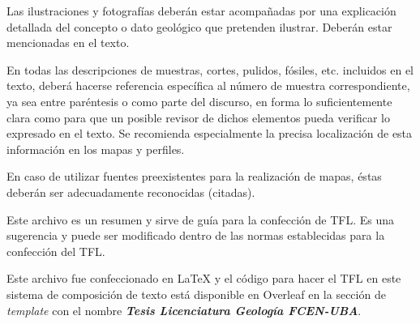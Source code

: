 Las ilustraciones y fotografías deberán estar acompañadas por una explicación detallada del concepto o dato geológico que pretenden ilustrar. Deberán estar mencionadas en el texto.\par
En todas las descripciones de muestras, cortes, pulidos, fósiles, etc. incluidos en el texto, deberá hacerse referencia específica al número de muestra correspondiente, ya sea entre paréntesis o como parte del discurso, en forma lo suficientemente clara como para que un posible revisor de dichos elementos pueda verificar lo expresado en el texto. Se recomienda especialmente la precisa localización de esta información en los mapas y perfiles.\par
En caso de utilizar fuentes preexistentes para la realización de mapas, éstas deberán ser adecuadamente reconocidas (citadas).\par
Este archivo es un resumen y sirve de guía para la confección de TFL. Es una sugerencia y puede ser modificado dentro de las normas establecidas para la confección del TFL.\par
Este archivo fue confeccionado en \LaTeX{} y el código para hacer el TFL en este sistema de composición de texto está disponible en \textsf{Overleaf} en la sección de \textit{template} con el nombre \textbf{\textit{Tesis Licenciatura Geología FCEN-UBA}}.
